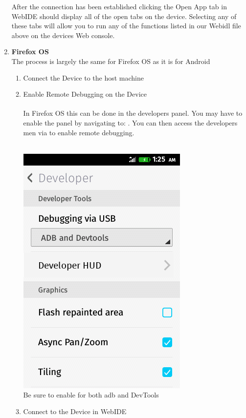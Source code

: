 \documentclass[12pt]{article}
\begin{document}
\begin{enumerate}
\begin{center}
After the connection has been established clicking the Open App tab in WebIDE should display all of the open tabs on the device.
Selecting any of these tabs will allow you to run any of the functions listed in our Webidl file above on the devices Web console. 
\end{center}
\item \textbf{Firefox OS} \\
The process is largely the same for Firefox OS as it is for Android
\begin{enumerate}
\item Connect the Device to the host machine
\pagebreak
\item Enable Remote Debugging on the Device \\ \\
In Firefox OS this can be done in the developers panel. You may have to enable the panel by navigating to: 
. You can then access
the developers men via  to enable remote debugging.  \\ \\
\begin{center}
\includegraphics[scale=0.5]{developermenu-short} \\
Be sure to enable for both adb and DevTools
\end{center}
\item Connect to the Device in WebIDE
\end{enumerate}
\end{enumerate}
\pagebreak
\end{document}
